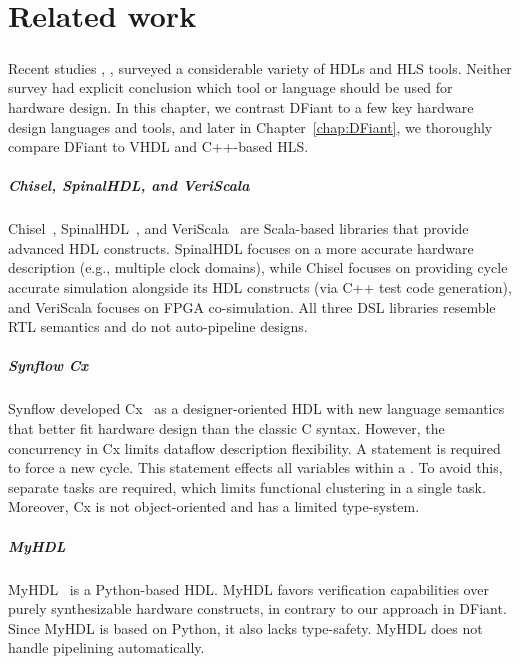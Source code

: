 

\chapter{Related work}
\label{chap:relwork}

\paragraph{}Recent studies \cite{Kapre2016}, \cite{Nane2016}, \cite{Windh2015} surveyed a considerable variety of HDLs and HLS tools. Neither survey had explicit conclusion which tool or language should be used for hardware design. In this chapter, we contrast DFiant to a few key hardware design languages and tools, and later in Chapter~\ref{chap:DFiant}, we thoroughly compare DFiant to VHDL and C++-based HLS.




\paragraph*{\bf \em Chisel, SpinalHDL, and VeriScala}
Chisel~\cite{Bachrach2012}, SpinalHDL~\cite{Charles2016}, and VeriScala~\cite{Liu2017} are Scala-based libraries that provide advanced HDL constructs. SpinalHDL focuses on a more accurate hardware description (e.g., multiple clock domains), while Chisel focuses on providing cycle accurate simulation alongside its HDL constructs (via C++ test code generation), and VeriScala focuses on FPGA co-simulation. All three DSL libraries resemble RTL semantics and do not auto-pipeline designs. 

\paragraph*{\bf \em Synflow Cx} 
Synflow developed Cx~\cite{CxLang2014} as a designer-oriented HDL with new language semantics that better fit hardware design than the classic C syntax.
However, the concurrency in Cx limits dataflow description flexibility. A  statement is required to force a new cycle. This statement effects all variables within a . To avoid this, separate tasks are required, which limits functional clustering in a single task.
Moreover, Cx is not object-oriented and has a limited type-system.

\paragraph*{\bf \em MyHDL}
MyHDL~\cite{decaluwe2004myhdl} is a Python-based HDL. MyHDL favors verification capabilities over purely synthesizable hardware constructs, in contrary to our approach in DFiant. Since MyHDL is based on Python, it also lacks type-safety. MyHDL does not handle pipelining automatically.

